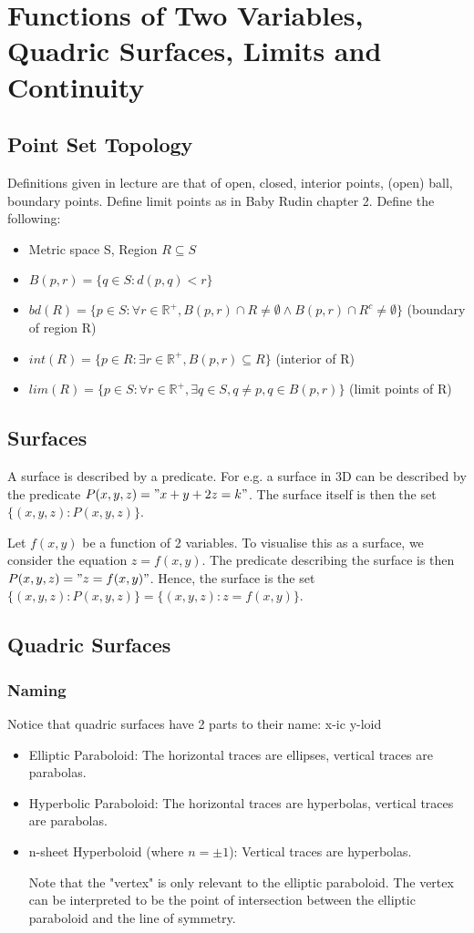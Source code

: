 \documentclass{article}
\begin{document}
\section{Functions of Two Variables, Quadric Surfaces, Limits and Continuity}

\subsection{Point Set Topology}
Definitions given in lecture are that of open, closed, interior points, (open) ball, boundary points.
Define limit points as in Baby Rudin chapter 2.
Define the following:
\begin{itemize}
	\item Metric space S, Region $R\subseteq S$ 
	\item $B(p, r) = \{q\in S : d(p,q)<r\}$ 
	\item $bd(R) = \{p\in S : \forall r\in \mathbb{R}^+, B(p,r) \cap R\neq \emptyset \land B(p,r)\cap R^c\neq \emptyset \}$ (boundary of region R)
	\item $int(R) = \{p\in R : \exists r\in \mathbb{R}^+, B(p,r) \subseteq R\}$ (interior of R)
	\item $lim(R) = \{p\in S :  \forall r\in \mathbb{R}^+, \exists q\in S, q\neq p, q\in B(p,r)\}$ (limit points of R)
\end{itemize}

\subsection{Surfaces}
A surface is described by a predicate. For e.g. a surface in 3D can be described by the predicate $P(x,y,z)="x+y+2z=k"$. The surface itself is then the set $\{(x,y,z):P(x,y,z)\}$.

Let $f(x,y)$ be a function of 2 variables. To visualise this as a surface, we consider the equation $z=f(x,y)$. The predicate describing the surface is then $P(x,y,z)="z=f(x,y)"$. Hence, the surface is the set $\{(x,y,z):P(x,y,z)\}=\{(x,y,z):z=f(x,y)\}$.

\subsection{Quadric Surfaces}
\subsubsection{Naming}
Notice that quadric surfaces have 2 parts to their name: x-ic y-loid\\
\begin{itemize}
	\item Elliptic Paraboloid: The horizontal traces are ellipses, vertical traces are parabolas.
	\item Hyperbolic Paraboloid: The horizontal traces are hyperbolas, vertical traces are parabolas. 
	\item n-sheet Hyperboloid (where $n=\pm 1$): Vertical traces are hyperbolas.
	
Note that the "vertex" is only relevant to the elliptic paraboloid. The vertex can be interpreted to be the point of intersection between the elliptic paraboloid and the line of symmetry.
\end{itemize}
\end{document}
